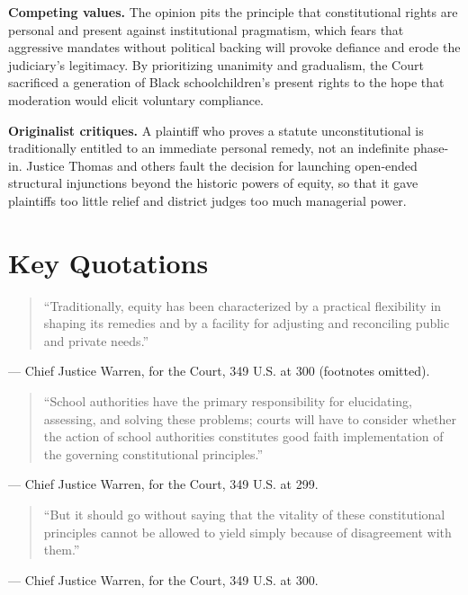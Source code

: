 \documentclass[12pt]{article}
\begin{document}
\textbf{Competing values.} The opinion pits the principle that constitutional rights are personal and present against institutional pragmatism, which fears that aggressive mandates without political backing will provoke defiance and erode the judiciary's legitimacy. By prioritizing unanimity and gradualism, the Court sacrificed a generation of Black schoolchildren's present rights to the hope that moderation would elicit voluntary compliance.

\textbf{Originalist critiques.} A plaintiff who proves a statute unconstitutional is traditionally entitled to an immediate personal remedy, not an indefinite phase-in. Justice Thomas and others fault the decision for launching open-ended structural injunctions beyond the historic powers of equity, so that it gave plaintiffs too little relief and district judges too much managerial power.

\section{Key Quotations}

\begin{quote}
``Traditionally, equity has been characterized by a practical flexibility in shaping its remedies and by a facility for adjusting and reconciling public and private needs.''
\end{quote}
\noindent --- Chief Justice Warren, for the Court, 349 U.S. at 300 (footnotes omitted).

\begin{quote}
``School authorities have the primary responsibility for elucidating, assessing, and solving these problems; courts will have to consider whether the action of school authorities constitutes good faith implementation of the governing constitutional principles.''
\end{quote}
\noindent --- Chief Justice Warren, for the Court, 349 U.S. at 299.

\begin{quote}
``But it should go without saying that the vitality of these constitutional principles cannot be allowed to yield simply because of disagreement with them.''
\end{quote}
\noindent --- Chief Justice Warren, for the Court, 349 U.S. at 300.
\end{document}
